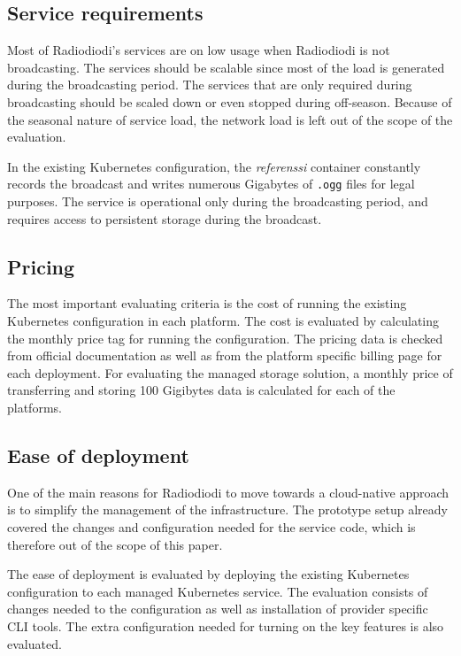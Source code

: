 \documentclass[article]{aaltoseries}
\begin{document}
\subsection{Service requirements}

Most of Radiodiodi's services are on low usage when Radiodiodi is not broadcasting. The services should be scalable since most of the load is generated during the broadcasting period. The services that are only required during broadcasting should be scaled down or even stopped during off-season. Because of the seasonal nature of service load, the network load is left out of the scope of the evaluation.

In the existing Kubernetes configuration, the \textit{referenssi} container constantly records the broadcast and writes numerous Gigabytes of \texttt{.ogg} files for legal purposes. The service is operational only during the broadcasting period, and requires access to persistent storage during the broadcast.

\subsection{Pricing}

The most important evaluating criteria is the cost of running the existing Kubernetes configuration in each platform. The cost is evaluated by calculating the monthly price tag for running the configuration. The pricing data is checked from official documentation as well as from the platform specific billing page for each deployment. For evaluating the managed storage solution, a monthly price of transferring and storing 100 Gigibytes data is calculated for each of the platforms.

\subsection{Ease of deployment}

One of the main reasons for Radiodiodi to move towards a cloud-native approach is to simplify the management of the infrastructure. The prototype setup already covered the changes and configuration needed for the service code, which is therefore out of the scope of this paper.

The ease of deployment is evaluated by deploying the existing Kubernetes configuration to each managed Kubernetes service. The evaluation consists of changes needed to the configuration as well as installation of provider specific CLI tools. The extra configuration needed for turning on the key features is also evaluated.
\end{document}
